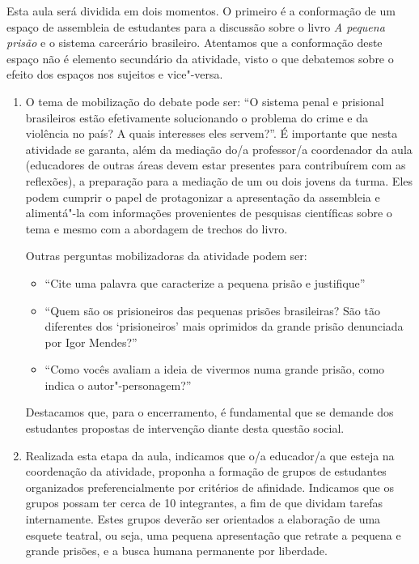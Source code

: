 \documentclass[11pt]{extarticle}
\begin{document}
 Esta aula será dividida em dois momentos. O
primeiro é a conformação de um espaço de assembleia de estudantes para a
discussão sobre o livro \emph{A pequena prisão} e o sistema carcerário
brasileiro. Atentamos que a conformação deste espaço não é elemento
secundário da atividade, visto o que debatemos sobre o efeito dos
espaços nos sujeitos e vice"-versa. 
\begin{enumerate}

\item O tema de mobilização do debate pode
ser: ``O sistema penal e prisional brasileiros estão efetivamente
solucionando o problema do crime e da violência no país? A quais
interesses eles servem?''. É importante que nesta atividade se garanta, além
da mediação do/a professor/a coordenador da aula (educadores de outras áreas
devem estar presentes para contribuírem com as reflexões), a
preparação para a mediação de um ou dois jovens da turma. Eles podem
cumprir o papel de protagonizar a apresentação da assembleia e
alimentá"-la com informações provenientes de pesquisas científicas sobre
o tema e mesmo com a abordagem de trechos do livro. 

Outras perguntas
mobilizadoras da atividade podem ser:

\begin{itemize}
\item ``Cite uma palavra que caracterize a
pequena prisão e justifique''

\item ``Quem são os prisioneiros das pequenas
prisões brasileiras? São tão diferentes dos `prisioneiros' mais
oprimidos da grande prisão denunciada por Igor Mendes?''

\item ``Como vocês
avaliam a ideia de vivermos numa grande prisão, como indica o
autor"-personagem?'' 
\end{itemize}

Destacamos que, para o encerramento, é fundamental que
se demande dos estudantes propostas de intervenção diante desta questão
social.

\item Realizada esta etapa da aula, indicamos que o/a educador/a que esteja na
coordenação da atividade, proponha a formação de grupos de estudantes
organizados preferencialmente por critérios de afinidade. Indicamos que
os grupos possam ter cerca de 10 integrantes, a fim de que dividam
tarefas internamente. Estes grupos deverão ser orientados a elaboração
de uma esquete teatral, ou seja, uma pequena apresentação que retrate a
pequena e grande prisões, e a busca humana permanente por liberdade.


\end{enumerate}
\end{document}
